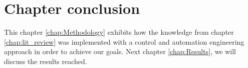 \section{Chapter conclusion}

This chapter \ref{chap:Methodology} exhibits how the knowledge from chapter \ref{chap:lit_review} was implemented with a control and automation engineering approach in order to achieve our goals. 
Next chapter \ref{chap:Results}, we will discuss the results reached.




\clearpage